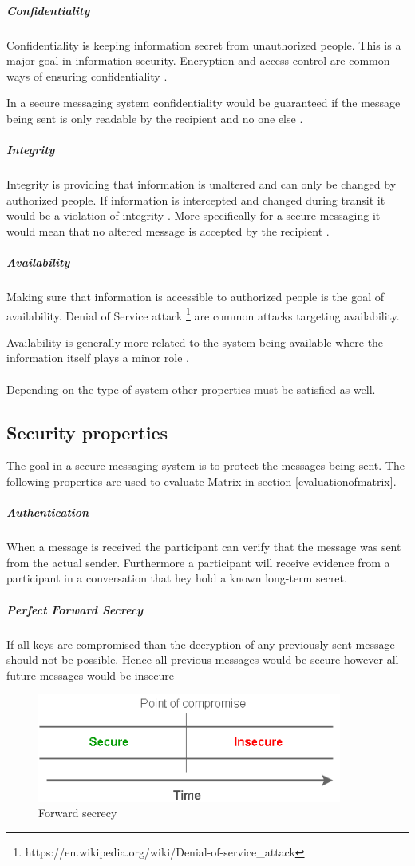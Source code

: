 \subparagraph{Confidentiality}
Confidentiality is keeping information secret from unauthorized people. This is a major goal in information security. Encryption and access control are common ways of ensuring confidentiality \cite{michael2012}.

In a secure messaging system confidentiality would be guaranteed if the message being sent is only readable by the recipient and no one else \cite{sok}.

\subparagraph{Integrity}
Integrity is providing that information is unaltered and can only be changed by authorized people. If information is intercepted and changed during transit it would be a violation of integrity \cite{michael2012}.  
More specifically for a secure messaging it would mean that no altered message is accepted by the recipient \cite{sok}.

\subparagraph{Availability}
Making sure that information is accessible to authorized people is the goal of availability. Denial of Service attack \footnote{https://en.wikipedia.org/wiki/Denial-of-service\_attack} are common attacks targeting availability. 

Availability is generally more related to the system being available where the information itself plays a minor role \cite{michael2012}.
\\
\\
Depending on the type of system other properties must be satisfied as well. 


\subsection{Security properties}
The goal in a secure messaging system is to protect the messages being sent. The following properties are used to evaluate Matrix in section \ref{evaluationofmatrix}. 


\subparagraph{Authentication}
When a message is received the participant can verify that the message was sent from the actual sender. Furthermore a participant will receive evidence from a participant in a conversation that hey hold a known long-term secret. 



\subparagraph{Perfect Forward Secrecy}
If all keys are compromised than the decryption of any previously sent message should not be possible. Hence all previous messages would be secure however all future messages would be insecure 

\begin{figure}[H]
	\centering
	\includegraphics[width=10cm]{figures/forwardsecrecy.png}
	\caption{Forward secrecy}
	\label{fig:forward}
\end{figure}

